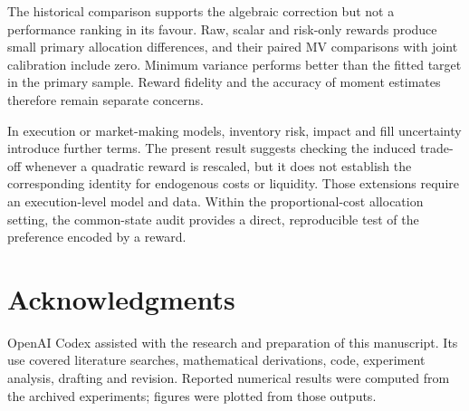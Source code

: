 \documentclass[sigconf,anonymous,review]{acmart}
\begin{document}
The historical comparison supports the algebraic correction but not a performance ranking in its favour. Raw, scalar and risk-only rewards produce small primary allocation differences, and their paired MV comparisons with joint calibration include zero. Minimum variance performs better than the fitted target in the primary sample. Reward fidelity and the accuracy of moment estimates therefore remain separate concerns.

In execution or market-making models, inventory risk, impact and fill uncertainty introduce further terms. The present result suggests checking the induced trade-off whenever a quadratic reward is rescaled, but it does not establish the corresponding identity for endogenous costs or liquidity. Those extensions require an execution-level model and data. Within the proportional-cost allocation setting, the common-state audit provides a direct, reproducible test of the preference encoded by a reward.

\section*{Acknowledgments}
OpenAI Codex assisted with the research and preparation of this manuscript. Its use covered literature searches, mathematical derivations, code, experiment analysis, drafting and revision. Reported numerical results were computed from the archived experiments; figures were plotted from those outputs.

\clearpage


\end{document}
